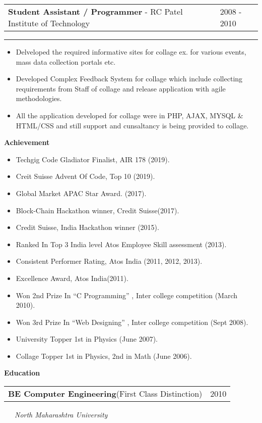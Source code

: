\documentclass[10pt,A4]{article}
\newcommand{\cvsection}[1]
{
	\begin{center}
		\large\textcolor{sectcol}{\textbf{#1}}
	\end{center}
}
\newcommand{\cvevent}[4]
{

\begin{tabular*}{1\textwidth}{p{13.6cm}  x{3.9cm}}
	\textbf{#2} - \textcolor{bgcol}{#3} &   \vspace{2.0pt}\textcolor{sectcol}{#1}
\end{tabular*}

\vspace{-8pt}
\textcolor{softcol}{\hrule}
\vspace{6pt}

  #4 

}
\newcommand{\cvedu}[3]
{

\begin{tabular*}{1\textwidth}{p{13.6cm}  x{3.9cm}}
	\textbf{#2}\tab \small{(First Class Distinction)} & \tab\textcolor{sectcol}{#1} 
\end{tabular*}

	\vspace{-1pt}
	\ \ \ \textcolor{bgcol}{\small{\textit{#3}}}
	\ \ \ \vspace{10pt}

}
\begin{document}

%
\cvevent{2008 - 2010}
{Student Assistant / Programmer}
{RC Patel Institute of Technology}
{
\begin{itemize}
	\item Delveloped the required informative sites for collage ex. for various events, mass data collection portals etc.
	\item Developed Complex Feedback System for collage which include collecting requirements from Staff of collage and release application with agile methodologies.
	\item All the application developed for collage were in PHP, AJAX, MYSQL \& HTML/CSS and still support and cunsaltancy is being provided to collage.
\end{itemize}

}

\cvsection{Achievement}

\begin{itemize}
\item Techgig Code Gladiator Finalist, AIR 178 (2019).
\item Creit Suisse Advent Of Code, Top 10 (2019).
\item Global Market APAC Star Award. (2017).
\item Block-Chain Hackathon winner, Credit Suisse(2017).
\item Credit Suisse, India Hackathon winner (2015).
\item Ranked In Top 3 India level Atos Employee Skill assessment (2013).
\item Consistent Performer Rating, Atos India (2011, 2012, 2013).
\item Excellence Award, Atos India(2011).
\item Won 2nd Prize In “C Programming” , Inter college competition (March 2010).
\item Won 3rd Prize In “Web Designing” , Inter college competition (Sept 2008).
\item University Topper 1st in Physics (June 2007).
\item Collage Topper 1st in Physics, 2nd in Math (June 2006).
\end{itemize}


\cvsection{Education}

\cvedu{2010}{BE Computer Engineering}{North Maharashtra University}
\end{document}
